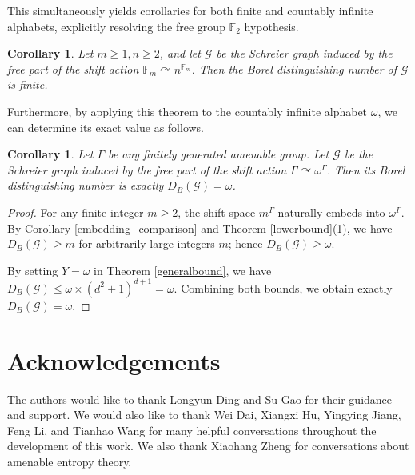\documentclass[11pt, reqno, a4paper]{amsart}
\theoremstyle{plain}
\newtheorem{corollary}[theorem]{Corollary}
\theoremstyle{definition}
\theoremstyle{remark}
\begin{document}
This  simultaneously yields  corollaries for both finite and countably infinite alphabets, explicitly resolving the free group $\mathbb{F}_2$ hypothesis.

\begin{corollary}
Let $m\ge 1, n\ge 2$, and let $\mathcal{G}$ be the Schreier graph induced by the free part of the shift action $\mathbb{F}_m \curvearrowright n^{\mathbb{F}_m}$. Then the Borel distinguishing number of $\mathcal{G}$ is  finite. 
\end{corollary}

Furthermore, by applying this theorem to the countably infinite alphabet $\omega$, we can determine its exact value as follows.

\begin{corollary}
Let $\Gamma$ be any finitely generated amenable group. Let $\mathcal{G}$ be the Schreier graph induced by the free part of the shift action $\Gamma \curvearrowright \omega^\Gamma$. Then its Borel distinguishing number is exactly $D_B(\mathcal{G}) = \omega$.
\end{corollary}

\begin{proof}
For any finite integer $m \ge 2$, the shift space $m^\Gamma$ naturally embeds into $\omega^\Gamma$. By Corollary \ref{embedding_comparison} and Theorem \ref{lowerbound}(1), we have $D_B(\mathcal{G})\ge m$ for arbitrarily large integers $m$; hence $D_B(\mathcal{G}) \ge \omega$. 

By setting $Y = \omega$ in Theorem \ref{generalbound}, we have $D_B(\mathcal{G}) \le \omega \times (d^2+1)^{d+1} = \omega$. Combining both bounds, we obtain exactly $D_B(\mathcal{G}) = \omega$.
\end{proof}



\section{Acknowledgements}
The authors would like to thank Longyun Ding and Su Gao for their guidance and support. We would also like to thank 
Wei Dai, Xiangxi Hu, Yingying Jiang, Feng Li, and Tianhao Wang for many helpful conversations throughout the development of this work. We also thank Xiaohang Zheng for conversations about amenable entropy theory.

\end{document}
